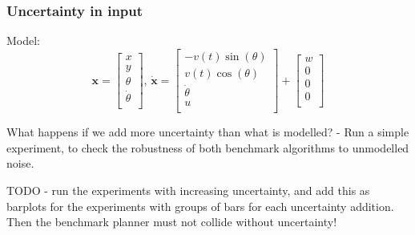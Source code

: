 \subsubsection{Uncertainty in input}
Model:
\begin{equation}
  \label{eq:model-dynamics-experiments}
  \mathbf{x} =
  \begin{bmatrix}
    x \\ y \\ \theta \\ \dot{\theta} \\
  \end{bmatrix}, \, \dot{\mathbf{x}} =
  \begin{bmatrix}
    -v(t)   \sin(\theta) \\
    v(t) \cos(\theta) \\
    \dot{\theta} \\
    u \\
  \end{bmatrix}
  +
  \begin{bmatrix}
    w \\
    0 \\
    0 \\
    0 \\
  \end{bmatrix}
\end{equation}

What happens if we add more uncertainty than what is modelled? - Run a simple
experiment, to check the robustness of both benchmark algorithms to unmodelled
noise.

TODO - run the experiments with increasing uncertainty, and add this as barplots
for the experiments with groups of bars for each uncertainty addition. Then the
benchmark planner must not collide without uncertainty!
